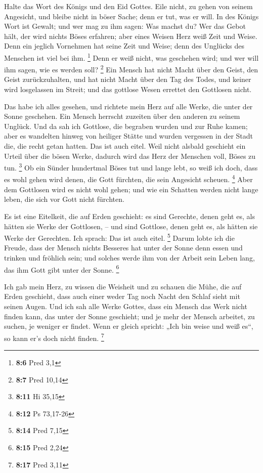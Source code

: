  Halte das Wort des Königs und den Eid Gottes. 
Eile nicht, zu gehen von seinem Angesicht, und bleibe nicht in böser
Sache; denn er tut, was er will.  In des Königs Wort ist
Gewalt; und wer mag zu ihm sagen: Was machst du?  Wer das
Gebot hält, der wird nichts Böses erfahren; aber eines Weisen Herz weiß
Zeit und Weise.  Denn ein jeglich Vornehmen hat seine Zeit
und Weise; denn des Unglücks des Menschen ist viel bei ihm. \footnote{\textbf{8:6}
  Pred 3,1}  Denn er weiß nicht, was geschehen wird; und wer
will ihm sagen, wie es werden soll? \footnote{\textbf{8:7} Pred 10,14}
 Ein Mensch hat nicht Macht über den Geist, den Geist
zurückzuhalten, und hat nicht Macht über den Tag des Todes, und keiner
wird losgelassen im Streit; und das gottlose Wesen errettet den
Gottlosen nicht.

 Das habe ich alles gesehen, und richtete mein Herz auf alle
Werke, die unter der Sonne geschehen. Ein Mensch herrscht zuzeiten über
den anderen zu seinem Unglück.  Und da sah ich Gottlose,
die begraben wurden und zur Ruhe kamen; aber es wandelten hinweg von
heiliger Stätte und wurden vergessen in der Stadt die, die recht getan
hatten. Das ist auch eitel.  Weil nicht alsbald geschieht
ein Urteil über die bösen Werke, dadurch wird das Herz der Menschen
voll, Böses zu tun. \footnote{\textbf{8:11} Hi 35,15}  Ob
ein Sünder hundertmal Böses tut und lange lebt, so weiß ich doch, dass
es wohl gehen wird denen, die Gott fürchten, die sein Angesicht scheuen.
\footnote{\textbf{8:12} Ps 73,17-26}  Aber dem Gottlosen
wird es nicht wohl gehen; und wie ein Schatten werden nicht lange leben,
die sich vor Gott nicht fürchten.

 Es ist eine Eitelkeit, die auf Erden geschieht: es sind
Gerechte, denen geht es, als hätten sie Werke der Gottlosen, -- und sind
Gottlose, denen geht es, als hätten sie Werke der Gerechten. Ich sprach:
Das ist auch eitel. \footnote{\textbf{8:14} Pred 7,15} 
Darum lobte ich die Freude, dass der Mensch nichts Besseres hat unter
der Sonne denn essen und trinken und fröhlich sein; und solches werde
ihm von der Arbeit sein Leben lang, das ihm Gott gibt unter der Sonne.
\footnote{\textbf{8:15} Pred 2,24}

 Ich gab mein Herz, zu wissen die Weisheit und zu schauen
die Mühe, die auf Erden geschieht, dass auch einer weder Tag noch Nacht
den Schlaf sieht mit seinen Augen.  Und ich sah alle Werke
Gottes, dass ein Mensch das Werk nicht finden kann, das unter der Sonne
geschieht; und je mehr der Mensch arbeitet, zu suchen, je weniger er
findet. Wenn er gleich spricht: „Ich bin weise und weiß es``, so kann
er's doch nicht finden. \footnote{\textbf{8:17} Pred 3,11}

